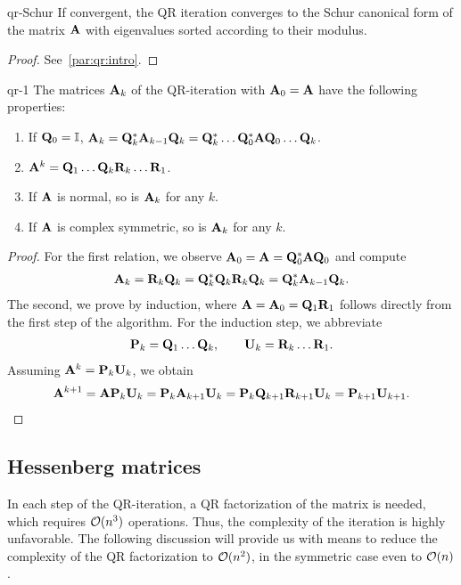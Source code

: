 \begin{Lemma}{qr-Schur}
  If convergent, the QR iteration converges to the Schur canonical
  form of the matrix $\mathbf A$ with eigenvalues sorted according to
  their modulus.
\end{Lemma}

\begin{proof}
  See~\ref{par:qr:intro}.
\end{proof}

\begin{Lemma}{qr-1}
  The matrices $\mathbf A_k$ of the QR-iteration with $\mathbf A_0 = \mathbf A$
  have the following properties:
  \begin{enumerate}
  \item If $\mathbf Q_0=\mathbb I$, $\mathbf A_{k} = \mathbf Q_k^*\mathbf A_{k-1}\mathbf Q_k = \mathbf Q_k^*\dots\mathbf Q_0^*\mathbf A\mathbf Q_0\dots\mathbf Q_k$.
  \item $\mathbf A^k=\mathbf Q_1\dots\mathbf Q_k\mathbf R_k\dots\mathbf R_1$.
  \item If $\mathbf A$ is normal, so is $\mathbf A_k$ for any $k$.
  \item If $\mathbf A$ is complex symmetric, so is $\mathbf A_k$ for any $k$.
  \end{enumerate}
\end{Lemma}

\begin{proof}
  For the first relation, we observe
  $\mathbf A_0 = \mathbf A = \mathbf Q_0^*\mathbf A\mathbf Q_0$ and compute
  \begin{gather}
    \mathbf A_{k} = \mathbf R_k\mathbf Q_k = \mathbf Q_k^* \mathbf Q_k \mathbf R_k \mathbf Q_k = \mathbf Q_k^* \mathbf A_{k-1} \mathbf Q_k.
  \end{gather}
  The second, we prove by induction, where
  $\mathbf A = \mathbf A_0 = \mathbf Q_1\mathbf R_1$ follows directly from the first
  step of the algorithm. For the induction step, we abbreviate
  \begin{gather}
    \mathbf P_k = \mathbf Q_1\dots\mathbf Q_k,\qquad \mathbf U_k = \mathbf R_k\dots\mathbf R_1.
  \end{gather}
  Assuming $\mathbf A^k = \mathbf P_k\mathbf U_k$, we obtain
  \begin{gather}
    \mathbf A^{k+1} = \mathbf A\mathbf P_k\mathbf U_k = \mathbf P_k\mathbf A_{k+1}\mathbf U_k
    = \mathbf P_k\mathbf Q_{k+1}\mathbf R_{k+1}\mathbf U_k = \mathbf P_{k+1}\mathbf U_{k+1}.
  \end{gather}
\end{proof}

\subsection{Hessenberg matrices}
\begin{intro}
  In each step of the QR-iteration, a QR factorization of the matrix
  is needed, which requires $\mathcal O(n^3)$ operations. Thus, the
  complexity of the iteration is highly unfavorable. The following
  discussion will provide us with means to reduce the complexity of
  the QR factorization to $\mathcal O(n^2)$, in the symmetric case even to
  $\mathcal O(n)$.
\end{intro}

